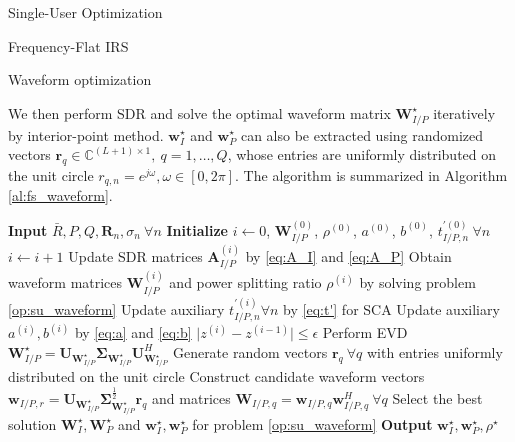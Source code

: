 \documentclass{IEEEtran}
\begin{document}
\begin{section}{Single-User Optimization}
\begin{subsection}{Frequency-Flat IRS}
\begin{subsubsection}{Waveform optimization}
\begin{maxi!}
			\end{maxi!}
			We then perform SDR and solve the optimal waveform matrix $\boldsymbol{W}_{I/P}^{\star}$ iteratively by interior-point method. $\boldsymbol{w}_I^{\star}$ and $\boldsymbol{w}_P^{\star}$ can also be extracted using randomized vectors $\boldsymbol{r}_q \in \mathbb{C}^{(L+1) \times 1}, \ q=1,\dots,Q$, whose entries are uniformly distributed on the unit circle $r_{q,n}=e^{j\omega}, \omega \in [0,2\pi]$. The algorithm is summarized in Algorithm \ref{al:fs_waveform}.

			\begin{algorithm}
				\caption{Waveform Optimization}
				\label{alg:waveform}
				\begin{algorithmic}[1]
					\State \textbf{Input} $\bar{R},P,Q,\boldsymbol{R}_n,\sigma_n \ \forall n$
					\State \textbf{Initialize} $i \leftarrow 0$, $\boldsymbol{W}_{I/P}^{(0)}$, $\rho^{(0)}$, $a^{(0)}$, $b^{(0)}$, $t_{I/P,n}^{\prime (0)} \ \forall n$
					\Repeat
					\State $i \leftarrow i + 1$
					\State Update SDR matrices $\boldsymbol{A}_{I/P}^{(i)}$ by \ref{eq:A_I} and \ref{eq:A_P}
					\State Obtain waveform matrices $\boldsymbol{W}_{I/P}^{(i)}$ and power splitting ratio $\rho^{(i)}$ by solving problem \ref{op:su_waveform}
					\State Update auxiliary $t_{I/P,n}^{\prime (i)} \forall n$ by \ref{eq:t'} for SCA
					\State Update auxiliary $a^{(i)},b^{(i)}$ by \ref{eq:a} and \ref{eq:b}
					\Until $\lvert z^{(i)}-z^{(i-1)} \rvert \le \epsilon$
					\State Perform EVD $\boldsymbol{W}_{I/P}^{\star}=\boldsymbol{U}_{\boldsymbol{W}_{I/P}^{\star}}\boldsymbol{\Sigma}_{\boldsymbol{W}_{I/P}^{\star}}\boldsymbol{U}_{\boldsymbol{W}_{I/P}^{\star}}^H$
					\State Generate random vectors $\boldsymbol{r}_q \ \forall q$ with entries uniformly distributed on the unit circle
					\State Construct candidate waveform vectors $\boldsymbol{w}_{I/P,r}=\boldsymbol{U}_{\boldsymbol{W}_{I/P}^{\star}}\boldsymbol{\Sigma}_{\boldsymbol{W}_{I/P}^{\star}}^{\frac{1}{2}}\boldsymbol{r}_q$ and matrices $\boldsymbol{W}_{I/P,q}=\boldsymbol{w}_{I/P,q}\boldsymbol{w}_{I/P,q}^H  \ \forall q$
					\State Select the best solution $\boldsymbol{W}_{I}^\star,\boldsymbol{W}_{P}^\star$ and $\boldsymbol{w}_{I}^\star, \boldsymbol{w}_{P}^\star$ for problem \ref{op:su_waveform}
					\State \textbf{Output} $\boldsymbol{w}_I^\star, \boldsymbol{w}_P^\star, \rho^\star$
				\end{algorithmic}
			\end{algorithm}
		\end{subsubsection}


\end{subsection}
\end{section}
\end{document}
